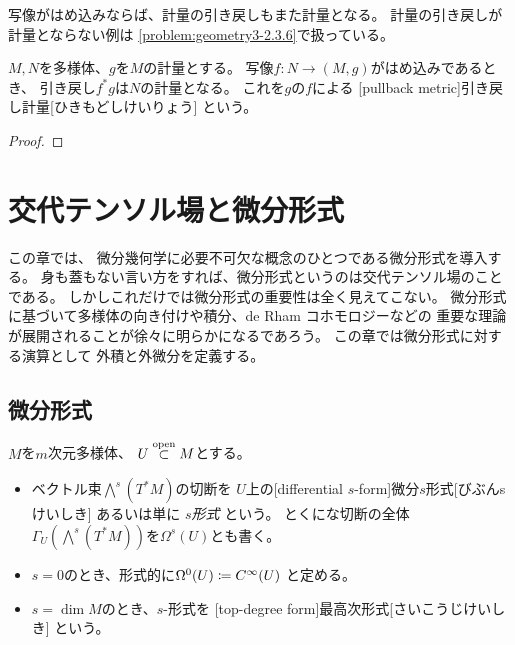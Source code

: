 \documentclass[report]{jlreq}
\begin{document}
{\smooth}写像がはめ込みならば、計量の引き戻しもまた計量となる。
計量の引き戻しが計量とならない例は
\cref{problem:geometry3-2.3.6}で扱っている。

\begin{proposition}[引き戻し計量]
    $M, N$を多様体、$g$を$M$の計量とする。
    {\smooth}写像$f \colon N \to (M, g)$がはめ込みであるとき、
    引き戻し$f^* g$は$N$の計量となる。
    これを$g$の$f$による
    [pullback metric]{引き戻し計量}[ひきもどしけいりょう]
    という。
\end{proposition}

\begin{proof}
    \TODO{}
\end{proof}




%
\newpage
\chapter{交代テンソル場と微分形式}


この章では、
微分幾何学に必要不可欠な概念のひとつである微分形式を導入する。
身も蓋もない言い方をすれば、微分形式というのは交代テンソル場のことである。
しかしこれだけでは微分形式の重要性は全く見えてこない。
微分形式に基づいて多様体の向き付けや積分、de Rham コホモロジーなどの
重要な理論が展開されることが徐々に明らかになるであろう。
この章では微分形式に対する演算として
外積と外微分を定義する。

%
\section{微分形式}

\begin{definition}[微分形式]
    $M$を$m$次元多様体、
    $U \stackrel{\text{open}}{\subset} M$とする。
    \begin{itemize}
        \item ベクトル束$\bigwedge^s(T^*M)$の切断を
            $U$上の[differential $s$-form]{微分$s$形式}[びぶんsけいしき]
            あるいは単に
            \emph{$s$形式}
            という。
            とくに{\smooth}な切断の全体
            $\Gamma_U(\bigwedge^s(T^*M))$を$\Omega^s(U)$とも書く。
        \item $s = 0$のとき、形式的に$\Omega^0(U) \coloneqq C^\infty(U)$
            と定める。
        \item $s = \dim M$のとき、$s$-形式を
            [top-degree form]{最高次形式}[さいこうじけいしき]
            という。
    \end{itemize}
\end{definition}
\end{document}
